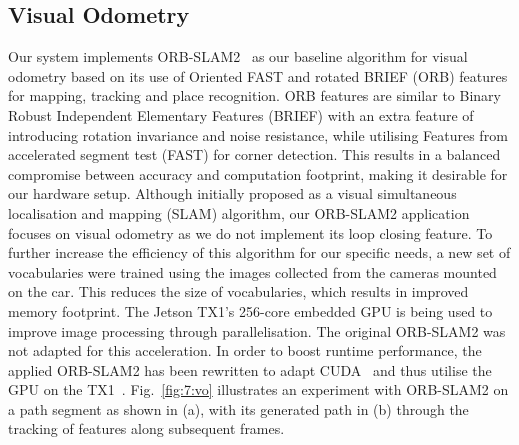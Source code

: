 \subsection{Visual Odometry}\label{sec:7:vo}
Our system implements ORB-SLAM2~\cite{mur-artal_orb-slam2:_2017} as our baseline algorithm for visual odometry based on its use of Oriented FAST and rotated BRIEF (ORB) features for mapping, tracking and place recognition. ORB features are similar to Binary Robust Independent Elementary Features (BRIEF) with an extra feature of introducing rotation invariance and noise resistance, while utilising Features from accelerated segment test (FAST) for corner detection. This results in a balanced compromise between accuracy and computation footprint, making it desirable for our hardware setup. Although initially proposed as a visual simultaneous localisation and mapping (SLAM) algorithm, our ORB-SLAM2 application focuses on visual odometry as we do not implement its loop closing feature. To further increase the efficiency of this algorithm for our specific needs, a new set of vocabularies were trained using the images collected from the cameras mounted on the car. This reduces the size of vocabularies, which results in improved memory footprint. The Jetson TX1's 256-core embedded GPU is being used to improve image processing through parallelisation. The original ORB-SLAM2 was not adapted for this acceleration. In order to boost runtime performance, the applied ORB-SLAM2 has been rewritten to adapt CUDA~\cite{nvidia_corporation_parallel_2016} and thus utilise the GPU on the TX1~\cite{chen_yunchih/orb-slam2-gpu2016-final_2019}. Fig.~\ref{fig:7:vo} illustrates an experiment with ORB-SLAM2 on a path segment as shown in (a), with its generated path in (b) through the tracking of features along subsequent frames.

